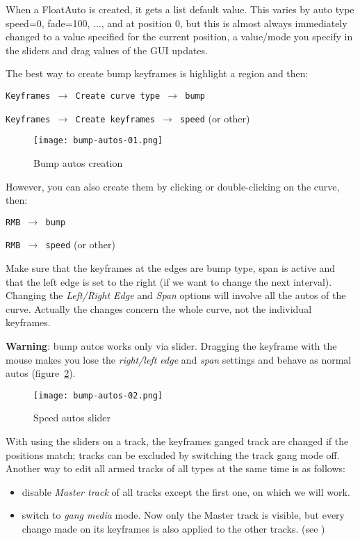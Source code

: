 When a FloatAuto is created, it gets a list default value.  This varies
by auto type speed=0, fade=100, ..., and at position 0, but this is almost
always immediately changed to a value specified for the current position,
a value/mode you specify in the sliders and drag values of the GUI updates.

The best way to create bump keyframes is highlight a region and then:

\texttt{Keyframes $\rightarrow$ Create curve type $\rightarrow$ bump}

\texttt{Keyframes $\rightarrow$ Create keyframes $\rightarrow$ speed} (or other)

\begin{figure}[htpb]
	\centering
	\texttt{[image: bump-autos-01.png]}
	\caption{Bump autos creation}
	\label{fig:bump-autos-01}
\end{figure}

However, you can also create them by clicking or double-clicking on the curve, then:

\texttt{RMB $\rightarrow$ bump}

\texttt{RMB $\rightarrow$ speed} (or other)

Make sure that the keyframes at the edges are bump type, span is active and that the left edge is set to the right (if we want to change the next interval). Changing the \textit{Left/Right Edge} and \textit{Span} options will involve all the autos of the curve. Actually the changes concern the whole curve, not the individual keyframes.

\textbf{Warning}: bump autos works only via slider. Dragging the keyframe with the mouse makes you lose the \textit{right/left edge} and \textit{span} settings and behave as normal autos (figure~\ref{fig:bump-autos-02}).

\begin{figure}[htpb]
	\centering
	\texttt{[image: bump-autos-02.png]}
	\caption{Speed autos slider}
	\label{fig:bump-autos-02}
\end{figure}

With using the sliders on a track, the keyframes ganged track are changed if the positions match; tracks can be excluded by switching the track gang mode off. Another way to edit all armed tracks of all types at the same time is as follows:

\begin{itemize}
	\item disable \textit{Master track} of all tracks except the first one, on which we will work.
	\item switch to \textit{gang media} mode. Now only the Master track is visible, but every change made on its keyframes is also applied to the other tracks. (see )
\end{itemize}

